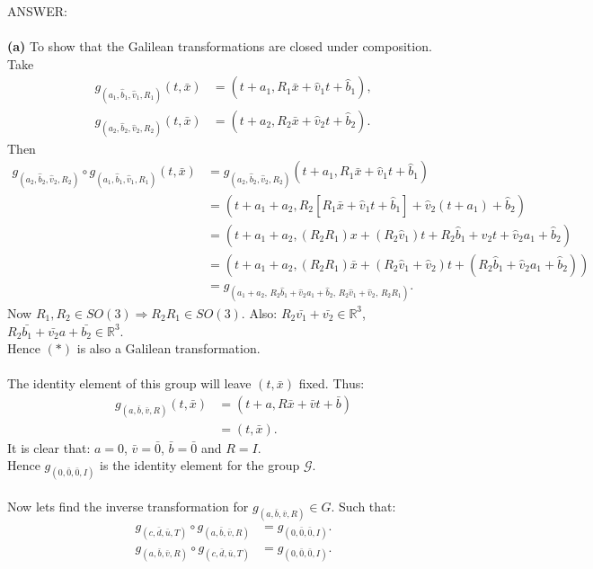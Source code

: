 \documentclass[12pt]{article}
\begin{document}
\newpage
\noindent
ANSWER:\\
\\
\noindent\textbf{(a)} To show that the Galilean transformations are closed under composition.\\
Take
\begin{align*}
g_{(a_1,\hat{b}_1,\hat{v}_1,R_1)}(t,\bar{x})
&=
(t+a_1,R_1\bar{x}+\hat{v}_1t+\hat{b}_1),\\
g_{(a_2,\hat{b}_2,\hat{v}_2,R_2)}(t,\bar{x})
&=
(t+a_2,R_2\bar{x}+\hat{v}_2t+\hat{b}_2).
\end{align*}
Then
\begin{align*}
g_{(a_2,\hat{b}_2,\hat{v}_2,R_2)}
\circ
g_{(a_1,\hat{b}_1,\hat{v}_1,R_1)}(t,\bar{x})
&=
g_{(a_2,\hat{b}_2,\hat{v}_2,R_2)}
(t+a_1,R_1\bar{x}+\hat{v}_1t+\hat{b}_1)\\
&=
\left(
t+a_1+a_2,
R_2[R_1\bar{x}+\hat{v}_1t+\hat{b}_1]
+\hat{v}_2(t+a_1)+\hat{b}_2
\right)\\
&=
\left(
t+a_1+a_2,
(R_2R_1)x
+(R_2\hat{v}_1)t
+R_2\hat{b}_1
+\hat{v}_2t
+\hat{v}_2a_1
+\hat{b}_2
\right)\\
&=
\left(
t+a_1+a_2,
(R_2R_1)\bar{x}
+(R_2\hat{v}_1+\hat{v}_2)t
+(R_2\hat{b}_1+\hat{v}_2a_1+\hat{b}_2)
\right)\\
&=
g_{(a_1+a_2,\,
R_2\hat{b}_1+\hat{v}_2a_1+\hat{b}_2,\,
R_2\hat{v}_1+\hat{v}_2,\,
R_2R_1)}.
\tag{*}
\end{align*}
Now $R_1,R_2\in SO(3)\Rightarrow R_2R_1\in SO(3)$.  Also: $R_2\bar{v_1}+\bar{v_2}\in\mathbb{R}^{3}$, $R_2\bar{b_1}+\bar{v_2}a+\bar{b_2} \in\mathbb{R}^{3}$.\\
Hence $(*)$ is also a Galilean transformation.\\
\\
The identity element of this group will leave $(t,\bar{x})$ fixed. Thus:
\begin{align*}
g_{(a,\bar{b},\bar{v},R)}(t,\bar{x})
&=(t+a,R\bar{x}+\bar{v}t+\bar{b})\\
&=(t,\bar{x}).
\end{align*}
It is clear that: $a=0$, $\bar{v}=\bar{0}$, $\bar{b}=\bar{0}$ and $R=I$.\\
Hence $g_{(0,\bar{0},\bar{0},I)}$ is the identity element for the group $\mathcal{G}$.\\
\\
Now lets find the inverse transformation for
$g_{(a,\bar{b},\bar{v},R)}\in G$.  Such that:
\begin{align*}
g_{(c,\bar{d},\bar{u},T)}
\circ g_{(a,\bar{b},\bar{v},R)}
&=g_{(0,\bar{0},\bar{0},I)}. \tag{1}\\
g_{(a,\bar{b},\bar{v},R)}
\circ g_{(c,\bar{d},\bar{u},T)}
&=g_{(0,\bar{0},\bar{0},I)}. \tag{2}
\end{align*}
\end{document}
